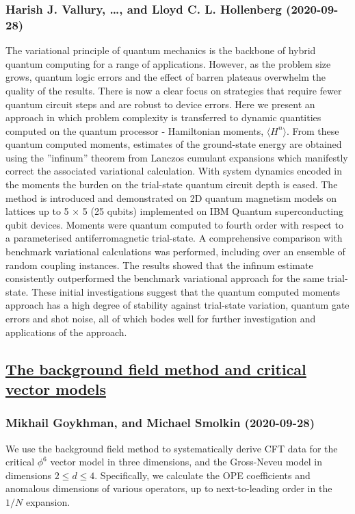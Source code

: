 \subsubsection*{Harish J. Vallury, \dots, and Lloyd C. L. Hollenberg (2020-09-28)}
The variational principle of quantum mechanics is the backbone of hybrid
quantum computing for a range of applications. However, as the problem size
grows, quantum logic errors and the effect of barren plateaus overwhelm the
quality of the results. There is now a clear focus on strategies that require
fewer quantum circuit steps and are robust to device errors. Here we present an
approach in which problem complexity is transferred to dynamic quantities
computed on the quantum processor - Hamiltonian moments, $\langle H^n\rangle$.
From these quantum computed moments, estimates of the ground-state energy are
obtained using the ''infinum'' theorem from Lanczos cumulant expansions which
manifestly correct the associated variational calculation. With system dynamics
encoded in the moments the burden on the trial-state quantum circuit depth is
eased. The method is introduced and demonstrated on 2D quantum magnetism models
on lattices up to 5 $\times$ 5 (25 qubits) implemented on IBM Quantum
superconducting qubit devices. Moments were quantum computed to fourth order
with respect to a parameterised antiferromagnetic trial-state. A comprehensive
comparison with benchmark variational calculations was performed, including
over an ensemble of random coupling instances. The results showed that the
infinum estimate consistently outperformed the benchmark variational approach
for the same trial-state. These initial investigations suggest that the quantum
computed moments approach has a high degree of stability against trial-state
variation, quantum gate errors and shot noise, all of which bodes well for
further investigation and applications of the approach.

\subsection*{\href{http://arxiv.org/abs/2009.13137v1}{The background field method and critical vector models}}
\subsubsection*{Mikhail Goykhman, and Michael Smolkin (2020-09-28)}
We use the background field method to systematically derive CFT data for the
critical $\phi^6$ vector model in three dimensions, and the Gross-Neveu model
in dimensions $2\leq d \leq 4$. Specifically, we calculate the OPE coefficients
and anomalous dimensions of various operators, up to next-to-leading order in
the $1/N$ expansion.

